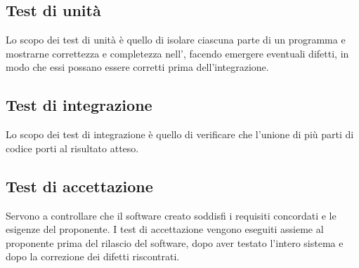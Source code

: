 \subsection{Test di unità}
Lo scopo dei test di unità è quello di isolare ciascuna parte di un programma e mostrarne correttezza e completezza nell', facendo emergere eventuali difetti, in modo che essi possano essere corretti prima dell'integrazione. 
\subsection{Test di integrazione}
Lo scopo dei test di integrazione è quello di verificare che l'unione di più parti di codice porti al risultato atteso. 
\subsection{Test di accettazione}
Servono a controllare che il software creato soddisfi i requisiti concordati e le esigenze del proponente. I test di accettazione vengono eseguiti assieme al proponente prima del rilascio del software, dopo aver testato l'intero sistema e dopo la correzione dei difetti riscontrati.